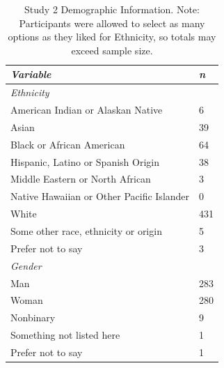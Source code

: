 \documentclass[12pt,]{article}
\begin{document}
\begin{table}[ht]
    \centering
    \begin{tabular}{l l}
        \toprule
        \emph{Variable} & \emph{n} \\
        \midrule
        \emph{Ethnicity} &  \\
        \hspace{1em} American Indian or Alaskan Native & 6 \\
        \hspace{1em} Asian & 39 \\
        \hspace{1em} Black or African American & 64 \\
        \hspace{1em} Hispanic, Latino or Spanish Origin & 38 \\
        \hspace{1em} Middle Eastern or North African & 3\\
        \hspace{1em} Native Hawaiian or Other Pacific Islander & 0 \\ 
        \hspace{1em} White & 431 \\ 
        \hspace{1em} Some other race, ethnicity or origin & 5 \\ 
        \hspace{1em} Prefer not to say & 3 \\ 
      \emph{Gender} & \\ 
         \hspace{1em} Man & 283 \\
         \hspace{1em} Woman & 280 \\
         \hspace{1em} Nonbinary & 9 \\
         \hspace{1em} Something not listed here & 1 \\
         \hspace{1em} Prefer not to say & 1 \\
        \bottomrule
    \end{tabular}
     \caption{Study 2 Demographic Information. Note: Participants were allowed to select as many options as they liked for Ethnicity, so totals may exceed sample size.}
     \label{demo2}
\end{table}
\end{document}
